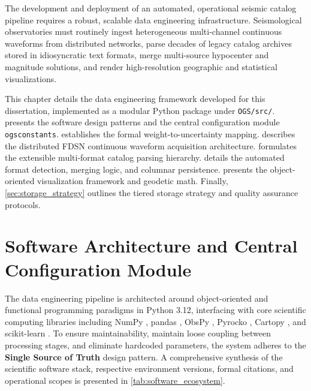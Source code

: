
\label{chap:data_engineering}

The development and deployment of an automated, operational seismic catalog
pipeline requires a robust, scalable data engineering infrastructure.
Seismological observatories must routinely ingest heterogeneous multi-channel
continuous waveforms from distributed networks, parse decades of legacy catalog
archives stored in idiosyncratic text formats, merge multi-source hypocenter
and magnitude solutions, and render high-resolution geographic and statistical
visualizations.

This chapter details the data engineering framework developed for this
dissertation, implemented as a modular Python package under \texttt{OGS/src/}.
 presents the software design patterns
and the central configuration module \texttt{ogsconstants}.
 establishes the formal
weight-to-uncertainty mapping.  describes the
distributed \ac{FDSN} continuous waveform acquisition architecture.
 formulates the extensible multi-format
catalog parsing hierarchy.  details the
automated format detection, merging logic, and columnar persistence.
 presents the object-oriented
visualization framework and geodetic math. Finally,
\cref{sec:storage_strategy} outlines the tiered storage strategy and
quality assurance protocols.

\section{Software Architecture and Central Configuration Module}
\label{sec:software_architecture}

The data engineering pipeline is architected around object-oriented and
functional programming paradigms in Python 3.12, interfacing with core
scientific computing libraries including NumPy \parencite{NumPy}, pandas
\parencite{McKinney2010,pandas}, ObsPy \parencite{ObsPy}, Pyrocko
\parencite{Pyrocko}, Cartopy \parencite{Cartopy}, and scikit-learn
\parencite{scikit-learn}. To ensure
maintainability, maintain loose coupling between processing stages, and
eliminate hardcoded parameters, the system adheres to the \textbf{Single
Source of Truth} design pattern. A comprehensive synthesis of the scientific
software stack, respective environment versions, formal citations, and
operational scopes is presented in \cref{tab:software_ecosystem}.


